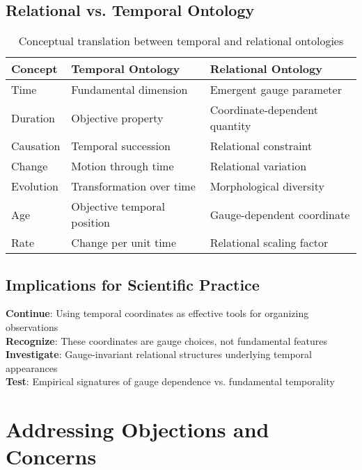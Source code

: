 \documentclass[11pt]{article}
\theoremstyle{definition}
\theoremstyle{plain}
\theoremstyle{remark}
\begin{document}
\subsection{Relational vs. Temporal Ontology}

\begin{table}[h!]
\centering
\begin{tabular}{|l|l|l|}
\hline
\textbf{Concept} & \textbf{Temporal Ontology} & \textbf{Relational Ontology} \\
\hline
Time & Fundamental dimension & Emergent gauge parameter \\
Duration & Objective property & Coordinate-dependent quantity \\
Causation & Temporal succession & Relational constraint \\
Change & Motion through time & Relational variation \\
Evolution & Transformation over time & Morphological diversity \\
Age & Objective temporal position & Gauge-dependent coordinate \\
Rate & Change per unit time & Relational scaling factor \\
\hline
\end{tabular}
\caption{Conceptual translation between temporal and relational ontologies}
\end{table}

\subsection{Implications for Scientific Practice}

\begin{keypoint}
\textbf{Continue}: Using temporal coordinates as effective tools for organizing observations\\
\textbf{Recognize}: These coordinates are gauge choices, not fundamental features\\
\textbf{Investigate}: Gauge-invariant relational structures underlying temporal appearances\\
\textbf{Test}: Empirical signatures of gauge dependence vs. fundamental temporality
\end{keypoint}

\section{Addressing Objections and Concerns}
\end{document}
